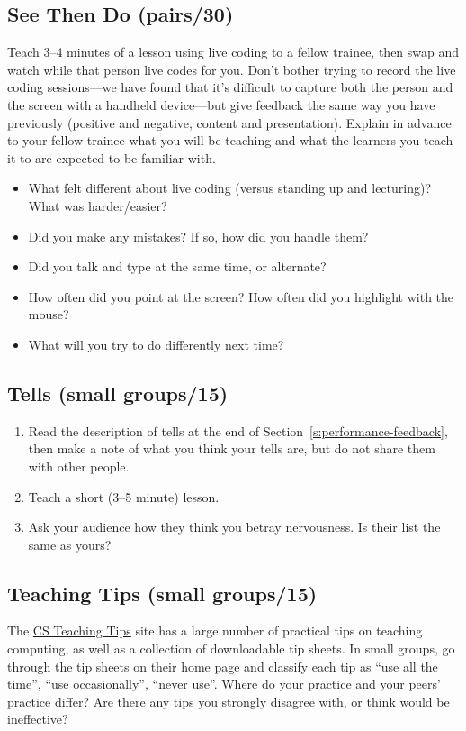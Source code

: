 \subsection{See Then Do (pairs/30)}\label{see-then-do-pairs30}

Teach 3--4 minutes of a lesson using live coding to a fellow trainee,
then swap and watch while that person live codes for you. Don't bother
trying to record the live coding sessions---we have found that it's
difficult to capture both the person and the screen with a handheld
device---but give feedback the same way you have previously (positive and
negative, content and presentation). Explain in advance to your fellow
trainee what you will be teaching and what the learners you teach it to
are expected to be familiar with.

\begin{itemize}
\item
  What felt different about live coding (versus standing up and
  lecturing)? What was harder/easier?
\item
  Did you make any mistakes? If so, how did you handle them?
\item
  Did you talk and type at the same time, or alternate?
\item
  How often did you point at the screen? How often did you highlight
  with the mouse?
\item
  What will you try to do differently next time?
\end{itemize}

\subsection{Tells (small groups/15)}\label{tells-small-groups15}

\begin{enumerate}
\item
  Read the description of tells at the end of
  Section~\ref{s:performance-feedback}, then make a note of what you
  think your tells are, but do not share them with other people.
\item
  Teach a short (3--5 minute) lesson.
\item
  Ask your audience how they think you betray nervousness. Is their
  list the same as yours?
\end{enumerate}

\subsection{Teaching Tips (small groups/15)}\label{teaching-tips-small-groups15}

The \href{http://csteachingtips.org/}{CS Teaching Tips} site has a large number of
practical tips on teaching computing, as well as a collection of
downloadable tip sheets. In small groups, go through the tip sheets on
their home page and classify each tip as ``use all the time'', ``use
occasionally'', ``never use''. Where do your practice and your peers'
practice differ? Are there any tips you strongly disagree with, or
think would be ineffective?
